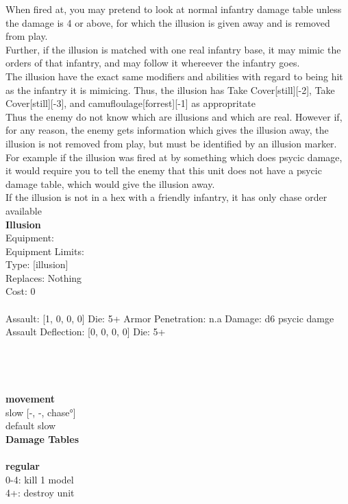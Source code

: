 \noindent When fired at, you may pretend to look at normal infantry damage table unless the damage is 4 or above, for which the illusion is given away and is removed from play.\\ 
Further, if the illusion is matched with one real infantry base, it may mimic the orders of that infantry, and may follow it whereever the infantry goes. \\ 
The illusion have the exact same modifiers and abilities with regard to being hit as the infantry it is mimicing. Thus, the illusion has Take Cover[still][-2], Take Cover[still][-3], and camufloulage[forrest][-1] as appropritate \\ 
 Thus the enemy do not know which are illusions and which are real. However if, for any reason, the enemy gets information which gives the illusion away, the illusion is not removed from play, but must be identified by an illusion marker. For example if the illusion was fired at by something which does psycic damage, it would require you to tell the enemy that this unit does not have a psycic damage table, which would give the illusion away.\\ 
If the illusion is not in a hex with a friendly infantry, it has only chase order available\\ 


{\bf Illusion } \\
Equipment:  \\
Equipment Limits:  \\
Type: [illusion] \\
Replaces: Nothing \\
Cost: 0\\
\ \\
Assault: [1, 0, 0, 0] Die: 5+ Armor Penetration: n.a Damage: d6 psycic damge \\
Assault Deflection: [0, 0, 0, 0] Die: 5+\\
\indent  
\ \\

\ \\
 
\ \\



\ \\ {\bf movement } \\
slow [-, -, chase°] \\
default slow \\


{\bf Damage Tables} \\
\ \\ {\bf regular } \\
0-4: kill 1 model \\
4+: destroy unit \\










